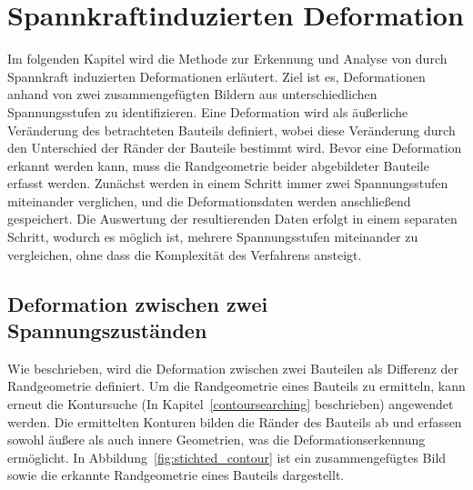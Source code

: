 
\chapter{Spannkraftinduzierten Deformation}

Im folgenden Kapitel wird die Methode zur Erkennung und Analyse von durch 
Spannkraft induzierten Deformationen erläutert. Ziel ist es, 
Deformationen anhand von zwei zusammengefügten Bildern aus unterschiedlichen 
Spannungsstufen zu identifizieren. Eine Deformation wird als äußerliche 
Veränderung des betrachteten Bauteils definiert, wobei diese Veränderung 
durch den Unterschied der Ränder der Bauteile bestimmt wird.
Bevor eine Deformation erkannt werden kann, muss die Randgeometrie beider 
abgebildeter Bauteile erfasst werden. 
Zunächst werden in einem Schritt immer zwei Spannungsstufen miteinander verglichen,
und die Deformationsdaten werden anschließend gespeichert. 
Die Auswertung der resultierenden Daten erfolgt in einem separaten Schritt, 
wodurch es möglich ist, mehrere Spannungsstufen miteinander zu vergleichen,
ohne dass die Komplexität des Verfahrens ansteigt.

\section{Deformation zwischen zwei Spannungszuständen}

Wie beschrieben, wird die Deformation zwischen zwei Bauteilen als Differenz 
der Randgeometrie definiert. Um die Randgeometrie eines Bauteils zu ermitteln, 
kann erneut die Kontursuche (In Kapitel~\ref{contoursearching} beschrieben)
angewendet werden. 
Die ermittelten Konturen bilden die Ränder des Bauteils ab und 
erfassen sowohl äußere als auch innere Geometrien, was 
die Deformationserkennung ermöglicht. In Abbildung~\ref{fig:stichted_contour} 
ist ein zusammengefügtes Bild sowie die erkannte Randgeometrie eines 
Bauteils dargestellt.

